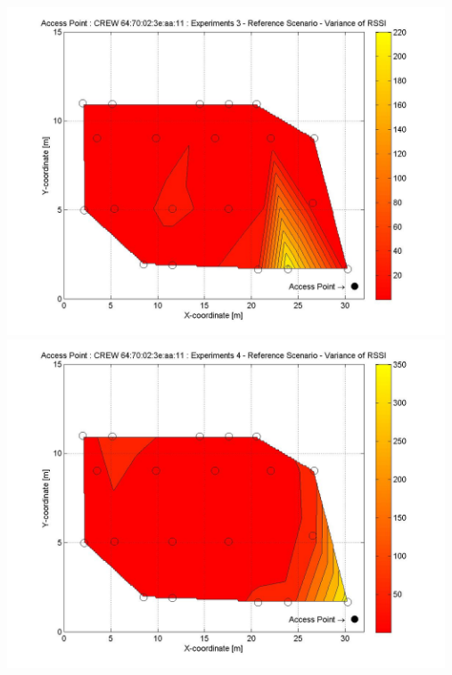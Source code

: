 \documentclass[11pt,a4paper,headinclude,footinclude,chapterprefix=on]{scrreprt}
\begin{document}
\begin{longtable}
	\includegraphics[width=13cm]{../../Source/plot/CREW_11/11_Ref_Ex_3_Variance.jpg} \\
	\includegraphics[width=13cm]{../../Source/plot/CREW_11/11_Ref_Ex_4_Variance.jpg} 
\end{longtable}
\end{document}
